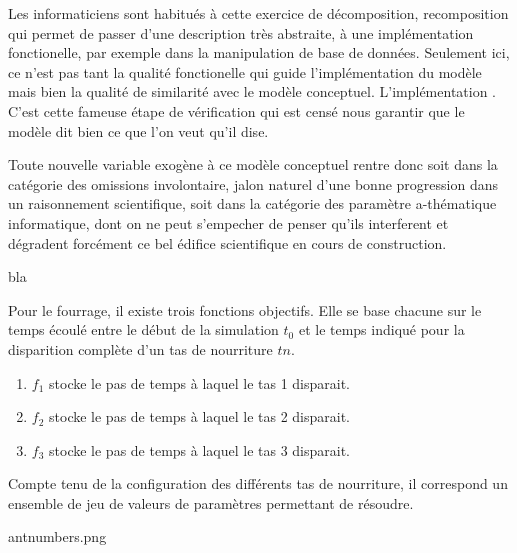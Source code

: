 Les informaticiens sont habitués à cette exercice de décomposition, recomposition qui permet de passer d'une description très abstraite, à une implémentation fonctionelle, par exemple dans la manipulation de base de données. Seulement ici, ce n'est pas tant la qualité fonctionelle qui guide l'implémentation du modèle mais bien la qualité de similarité avec le modèle conceptuel. L'implémentation . C'est cette fameuse étape de vérification qui est censé nous garantir que le modèle dit bien ce que l'on veut qu'il dise.

Toute nouvelle variable exogène à ce modèle conceptuel rentre donc soit dans la catégorie des omissions involontaire, jalon naturel d'une bonne progression dans un raisonnement scientifique, soit dans la catégorie des paramètre a-thématique informatique, dont on ne peut s'empecher de penser qu'ils interferent et dégradent forcément ce bel édifice scientifique en cours de construction.



\begin{framewithtitle}[bla]{bla}

Pour le fourrage, il existe trois fonctions objectifs. Elle se base chacune sur le temps écoulé entre le début de la simulation $t_0$ et le temps indiqué pour la disparition complète d'un tas de nourriture $tn$.

\begin{enumerate}
\item $f_1$ stocke le pas de temps à laquel le tas 1 disparait.
\item $f_2$ stocke le pas de temps à laquel le tas 2 disparait.
\item $f_3$ stocke le pas de temps à laquel le tas 3 disparait.
\end{enumerate}

Compte tenu de la configuration des différents tas de nourriture, il correspond un ensemble de jeu de valeurs de paramètres permettant de résoudre.

antnumbers.png

\end{framewithtitle}


